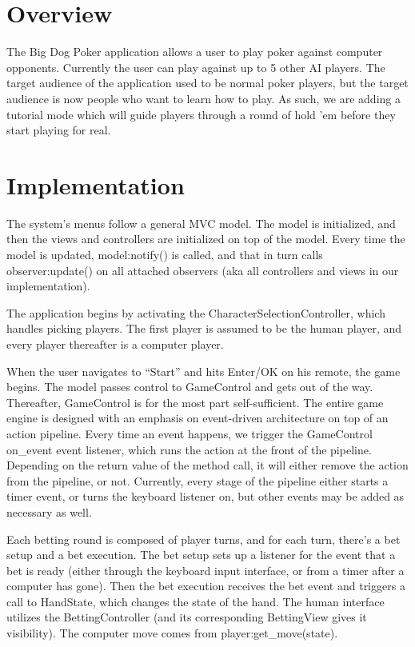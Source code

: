 \documentclass{article}
\begin{document}
\section*{Overview}
The Big Dog Poker application allows a user to play poker against
computer opponents. Currently the user can play against up to 5 other
AI players. The target audience of the application used to be normal
poker players, but the target audience is now people who want to learn
how to play. As such, we are adding a tutorial mode which will guide
players through a round of hold 'em before they start playing for
real.

\section*{Implementation}
The system's menus follow a general MVC model. The model is
initialized, and then the views and controllers are initialized on top
of the model. Every time the model is updated, model:notify() is
called, and that in turn calls observer:update() on all attached
observers (aka all controllers and views in our implementation).

The application begins by activating the CharacterSelectionController,
which handles picking players. The first player is assumed to be the
human player, and every player thereafter is a computer player.

When the user navigates to ``Start'' and hits Enter/OK on his remote,
the game begins. The model passes control to GameControl and gets out
of the way. Thereafter, GameControl is for the most part
self-sufficient. The entire game engine is designed with an emphasis
on event-driven architecture on top of an action pipeline. Every time
an event happens, we trigger the GameControl on\_event event listener,
which runs the action at the front of the pipeline. Depending on the
return value of the method call, it will either remove the action from
the pipeline, or not. Currently, every stage of the pipeline either
starts a timer event, or turns the keyboard listener on, but other
events may be added as necessary as well.

Each betting round is composed of player turns, and for each turn,
there's a bet setup and a bet execution. The bet setup sets up a
listener for the event that a bet is ready (either through the
keyboard input interface, or from a timer after a computer has
gone). Then the bet execution receives the bet event and triggers a
call to HandState, which changes the state of the hand. The human
interface utilizes the BettingController (and its corresponding
BettingView gives it visibility). The computer move comes from
player:get\_move(state).
\end{document}
